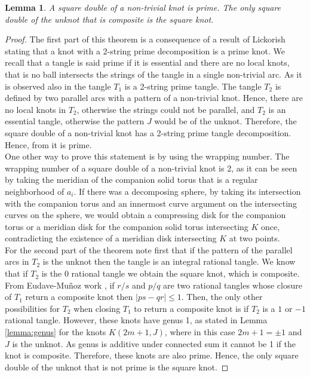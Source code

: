 \documentclass[reqno]{amsart}
\newtheorem{lem}{Lemma}
\theoremstyle{definition}
\theoremstyle{remark}
\begin{document}
\begin{lem}\label{lemma:prime}
A square double of a non-trivial knot is prime. The only square double of the unknot that is composite is the square knot.
\end{lem}
\begin{proof}
The first part of this theorem is a consequence of a result of Lickorish \cite{Lickorish-81} stating that a knot with a 2-string prime decomposition is a prime knot. We recall that a tangle is said prime if it is essential and there are no local knots, that is no ball intersects the strings of the tangle in a single non-trivial arc. As it is observed also in \cite{Lickorish-81} the tangle $T_1$ is a 2-string prime tangle. The tangle $T_2$ is defined by two parallel arcs with a pattern of a non-trivial knot. Hence,  there are no local knots in $T_2$,  otherwise the strings could not be parallel, and $T_2$ is an essential tangle, otherwise the pattern $J$ would be of the unknot.  Therefore, the square double of a non-trivial knot has a 2-string prime tangle decomposition. Hence, from \cite{Lickorish-81} it is prime. \\ One other way to prove this statement is by using the wrapping number. The wrapping number of a square double of a non-trivial knot is 2,  as it can be seen by taking the meridian of the companion solid torus that is a regular neighborhood of $a_i$.  If there was a decomposing sphere, by taking its intersection with the companion torus and an innermost curve argument on the intersecting curves on the sphere, we would obtain a compressing disk for the companion torus or a meridian disk for the companion solid torus intersecting $K$ once,  contradicting  the existence of a meridian disk intersecting $K$ at two points.\\
For the second part of the theorem note first that if the pattern of the parallel arcs in $T_2$ is the unknot then the tangle is an integral rational tangle. We know that if $T_2$ is the 0 rational tangle we obtain the square knot, which is composite. From Eudave-Muñoz work \cite{EN-88}, if $r/s$ and $p/q$ are two rational tangles whose closure of $T_1$ return a composite knot then $|ps-qr|\leq 1$. Then, the only other possibilities for $T_2$ when closing $T_1$ to return a composite knot is if $T_2$ is a $1$ or $-1$ rational tangle.  However, these knots have genus 1, as stated in Lemma \ref{lemma:genus} for the knots $K(2m+1, J)$, where in this case $2m+1=\pm 1$ and $J$ is the unknot. As genus is additive under connected sum it cannot be 1 if the knot is composite. Therefore, these knots are also prime. Hence, the only square double of the unknot that is not prime is the square knot. 
\end{proof}	
\end{document}
